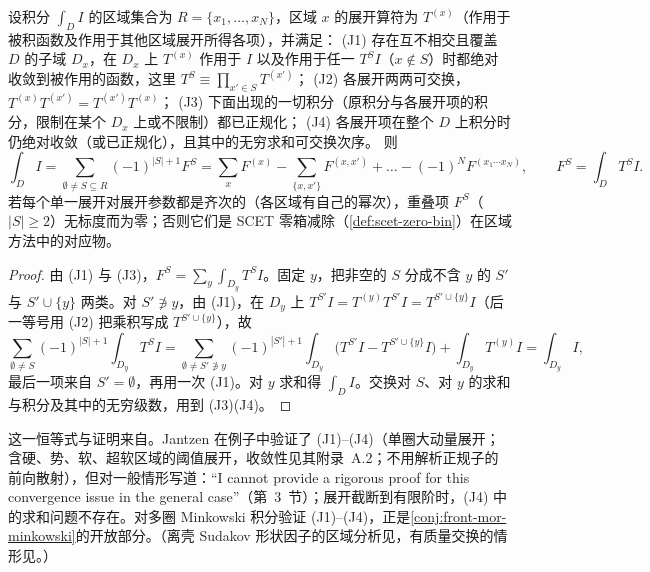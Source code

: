 \begin{lemma}\label{lem:front-jantzen}
设积分 $\int_DI$ 的区域集合为 $R=\{x_1,\dots,x_N\}$，区域 $x$ 的展开算符为 $T^{(x)}$（作用于被积函数及作用于其他区域展开所得各项），并满足：
(J1) 存在互不相交且覆盖 $D$ 的子域 $D_x$，在 $D_x$ 上 $T^{(x)}$ 作用于 $I$ 以及作用于任一 $T^{S}I$（$x\notin S$）时都绝对收敛到被作用的函数，这里 $T^S\equiv\prod_{x'\in S}T^{(x')}$；
(J2) 各展开两两可交换，$T^{(x)}T^{(x')}=T^{(x')}T^{(x)}$；
(J3) 下面出现的一切积分（原积分与各展开项的积分，限制在某个 $D_x$ 上或不限制）都已正规化；
(J4) 各展开项在整个 $D$ 上积分时仍绝对收敛（或已正规化），且其中的无穷求和可交换次序。
则
\begin{equation}\label{eq:front-jantzen}
\int_DI=\sum_{\emptyset\ne S\subseteq R}(-1)^{|S|+1}F^{S}
=\sum_xF^{(x)}-\sum_{\{x,x'\}}F^{(x,x')}+\dots-(-1)^NF^{(x_1\cdots x_N)},\qquad F^{S}=\int_DT^{S}I .
\end{equation}
若每个单一展开对展开参数都是齐次的（各区域有自己的幂次），重叠项 $F^S$（$|S|\ge2$）无标度而为零；否则它们是 SCET 零箱减除（\cref{def:scet-zero-bin}）在区域方法中的对应物。
\end{lemma}

\begin{proof}
由 (J1) 与 (J3)，$F^S=\sum_y\int_{D_y}T^SI$。固定 $y$，把非空的 $S$ 分成不含 $y$ 的 $S'$ 与 $S'\cup\{y\}$ 两类。对 $S'\not\ni y$，由 (J1)，在 $D_y$ 上 $T^{S'}I=T^{(y)}T^{S'}I=T^{S'\cup\{y\}}I$（后一等号用 (J2) 把乘积写成 $T^{S'\cup\{y\}}$），故
\begin{equation*}
\sum_{\emptyset\ne S}(-1)^{|S|+1}\int_{D_y}T^SI=\sum_{\emptyset\ne S'\not\ni y}(-1)^{|S'|+1}\int_{D_y}\bigl(T^{S'}I-T^{S'\cup\{y\}}I\bigr)+\int_{D_y}T^{(y)}I=\int_{D_y}I ,
\end{equation*}
最后一项来自 $S'=\emptyset$，再用一次 (J1)。对 $y$ 求和得 $\int_DI$。交换对 $S$、对 $y$ 的求和与积分及其中的无穷级数，用到 (J3)(J4)。
\end{proof}

这一恒等式与证明来自\cite[第~3~节]{Jantzen2011}。Jantzen 在例子中验证了 (J1)--(J4)（单圈大动量展开；含硬、势、软、超软区域的阈值展开，收敛性见其附录~A.2；不用解析正规子的前向散射），但对一般情形写道：“I cannot provide a rigorous proof for this convergence issue in the general case”（第~3~节）；展开截断到有限阶时，(J4) 中的求和问题不存在。对多圈 Minkowski 积分验证 (J1)--(J4)，正是\cref{conj:front-mor-minkowski}的开放部分。（离壳 Sudakov 形状因子的区域分析见\cite[第~2.2~节]{BecherBroggioFerroglia2015}，有质量交换的情形见\cite[第~6~节]{Jantzen2011}。）

